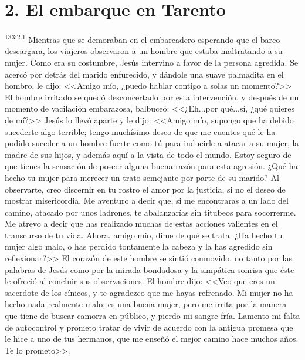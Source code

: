 \section*{2. El embarque en Tarento}
\par 
\textsuperscript{133:2.1} Mientras que se demoraban en el embarcadero esperando que el barco descargara, los viajeros observaron a un hombre que estaba maltratando a su mujer. Como era su costumbre, Jesús intervino a favor de la persona agredida. Se acercó por detrás del marido enfurecido, y dándole una suave palmadita en el hombro, le dijo: <<Amigo mío, ¿puedo hablar contigo a solas un momento?>> El hombre irritado se quedó desconcertado por esta intervención, y después de un momento de vacilación embarazosa, balbuceó: <<¿Eh...por qué...sí, ¿qué quieres de mí?>> Jesús lo llevó aparte y le dijo: <<Amigo mío, supongo que ha debido sucederte algo terrible; tengo muchísimo deseo de que me cuentes qué le ha podido suceder a un hombre fuerte como tú para inducirle a atacar a su mujer, la madre de sus hijos, y además aquí a la vista de todo el mundo. Estoy seguro de que tienes la sensación de poseer alguna buena razón para esta agresión. ¿Qué ha hecho tu mujer para merecer un trato semejante por parte de su marido? Al observarte, creo discernir en tu rostro el amor por la justicia, si no el deseo de mostrar misericordia. Me aventuro a decir que, si me encontraras a un lado del camino, atacado por unos ladrones, te abalanzarías sin titubeos para socorrerme. Me atrevo a decir que has realizado muchas de estas acciones valientes en el transcurso de tu vida. Ahora, amigo mío, dime de qué se trata. ¿Ha hecho tu mujer algo malo, o has perdido tontamente la cabeza y la has agredido sin reflexionar?>> El corazón de este hombre se sintió conmovido, no tanto por las palabras de Jesús como por la mirada bondadosa y la simpática sonrisa que éste le ofreció al concluir sus observaciones. El hombre dijo: <<Veo que eres un sacerdote de los cínicos, y te agradezco que me hayas refrenado. Mi mujer no ha hecho nada realmente malo; es una buena mujer, pero me irrita por la manera que tiene de buscar camorra en público, y pierdo mi sangre fría. Lamento mi falta de autocontrol y prometo tratar de vivir de acuerdo con la antigua promesa que le hice a uno de tus hermanos, que me enseñó el mejor camino hace muchos años. Te lo prometo>>.

